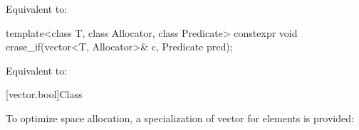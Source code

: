 \begin{itemdescr}
\pnum
\effects
Equivalent to: 
\end{itemdescr}

%
\begin{itemdecl}
template<class T, class Allocator, class Predicate>
  constexpr void erase_if(vector<T, Allocator>& c, Predicate pred);
\end{itemdecl}

\begin{itemdescr}
\pnum
\effects
Equivalent to: 
\end{itemdescr}

[vector.bool]{Class }

\pnum
{}%
To optimize space allocation, a specialization of vector for
elements is provided:

